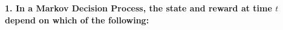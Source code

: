 \documentclass[prl,twocolumn,showpacs,preprintnumbers,superscriptaddress]{revtex4}
\theoremstyle{plain}
\theoremstyle{definition}
\begin{document}
\begin{widetext}
\noindent\textbf{1. In a Markov Decision Process, the state and reward at time $t$ depend on which of the following:}
\\
\\
\\

\end{widetext}
\end{document}
